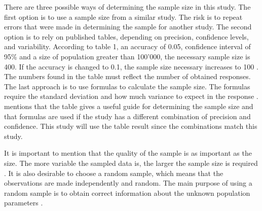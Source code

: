 There are three possible ways of determining the sample size in this study. The first option is to use a sample size from a similar study. The risk is to repeat errors that were made in determining the sample for another study. The second option is to rely on published tables, depending on precision, confidence levels, and variability. According to \cite{Israel1992} table 1, an accuracy of 0.05, confidence interval of 95\% and a size of population greater than 100'000, the necessary sample size is 400. If the accuracy is changed to 0.1, the sample size necessary increases to 100 \citep{Israel1992}. The numbers found in the table must reflect the number of obtained responses. The last approach is to use formulas to calculate the sample size. The formulas require the standard deviation and how much variance to expect in the response \citep{Smith2013}\citep{Israel1992}. \cite{Israel1992} mentions that the table gives a useful guide for determining the sample size and that formulas are used if the study has a different combination of precision and confidence. This study will use the table result since the combinations match this study.

It is important to mention that the quality of the sample is as important as the size. The more variable the sampled data is, the larger the sample size is required \citep{Israel1992}. It is also desirable to choose a random sample, which means that the observations are made independently and random. The main purpose of using a random sample is to obtain correct information about the unknown population parameters \citep{Walpole2012}. 




